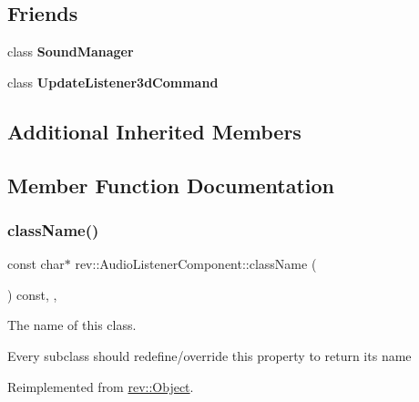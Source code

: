 \subsection*{Friends}
\begin{DoxyCompactItemize}
\item 
\mbox{\label{classrev_1_1_audio_listener_component_aee940642f2974e262db9284c0b1d9766}} 
class {\bfseries Sound\+Manager}
\item 
\mbox{\label{classrev_1_1_audio_listener_component_a6a755815108517ad8f4f6afabb704d30}} 
class {\bfseries Update\+Listener3d\+Command}
\end{DoxyCompactItemize}
\subsection*{Additional Inherited Members}


\subsection{Member Function Documentation}
\mbox{\label{classrev_1_1_audio_listener_component_a1e982f3e707ee7d961b581d112768ac4}} 
\subsubsection{\texorpdfstring{className()}{className()}}
{\footnotesize\ttfamily const char$\ast$ rev\+::\+Audio\+Listener\+Component\+::class\+Name (\begin{DoxyParamCaption}{ }\end{DoxyParamCaption}) const\hspace{0.3cm}{\ttfamily [inline]}, {\ttfamily [override]}, {\ttfamily [virtual]}}



The name of this class. 

Every subclass should redefine/override this property to return its name 

Reimplemented from \mbox{\hyperlink{classrev_1_1_object_a7a2013f91169479b65cf93afdc5d9a68}{rev\+::\+Object}}.

